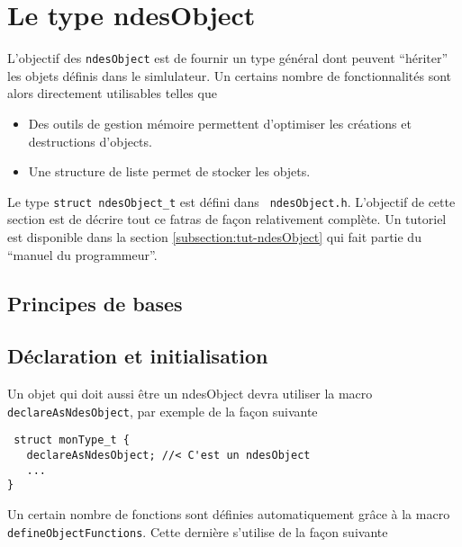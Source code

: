%
\section{Le type ndesObject}

   L'objectif des {\tt ndesObject} est de fournir un type général dont
peuvent ``hériter'' les objets définis dans le simlulateur. Un
certains nombre de fonctionnalités sont alors directement utilisables
telles que

\begin{itemize}
   \item Des outils de gestion mémoire permettent d'optimiser les
     créations et destructions d'objects.
   \item Une structure de liste permet de stocker les objets.
\end{itemize}

   Le type {\tt struct ndesObject\_t} est défini dans {\tt
ndesObject.h}. L'objectif de cette section est de décrire tout ce
fatras de façon relativement complète. Un tutoriel est disponible
dans la section \ref{subsection:tut-ndesObject} qui fait partie du
``manuel du programmeur''.

%
\subsection{Principes de bases}

%
\subsection{Déclaration et initialisation}

   Un objet qui doit aussi être un ndesObject devra utiliser la macro
\lstinline{declareAsNdesObject}, par exemple de la façon suivante


\begin{verbatim}
 struct monType_t {
   declareAsNdesObject; //< C'est un ndesObject 
   ...
}
\end{verbatim}

   Un certain nombre de fonctions sont définies automatiquement grâce
à la macro \lstinline{defineObjectFunctions}. Cette dernière s'utilise
de la façon suivante

